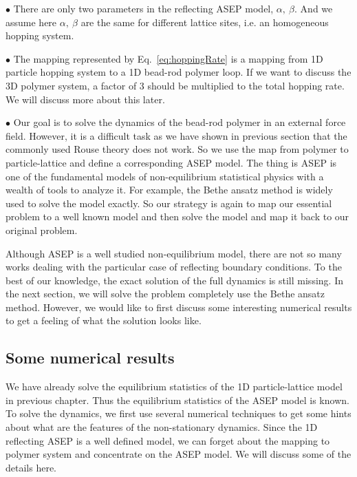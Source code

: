 $\bullet$ There are only two parameters in the reflecting ASEP model, $\alpha,~\beta$. And we assume here $\alpha,~\beta$ are the same for different lattice sites, i.e. an homogeneous hopping system. 

$\bullet$ The mapping represented by Eq.~\eqref{eq:hoppingRate} is a mapping from 1D particle hopping system to a 1D bead-rod polymer loop. If we want to discuss the 3D polymer system, a factor of $3$ should be multiplied to the total hopping rate. We will discuss more about this later. 

$\bullet$ Our goal is to solve the dynamics of the bead-rod polymer in an external force field. However, it is a difficult task as we have shown in previous section that the commonly used Rouse theory does not work. So we use the map from polymer to particle-lattice and define a corresponding ASEP model. The thing is ASEP is one of the fundamental models of non-equilibrium statistical physics with a wealth of tools to analyze it. For example, the Bethe ansatz method is widely used to solve the model exactly. So our strategy is again to map our essential problem to a well known model and then solve the model and map it back to our original problem. 

Although ASEP is a well studied non-equilibrium model, there are not so many works dealing with the particular case of reflecting boundary conditions. To the best of our knowledge, the exact solution of the full dynamics is still missing. In the next section, we will solve the problem completely use the Bethe ansatz method. However, we would like to first discuss some interesting numerical results to get a feeling of what the solution looks like. 

\subsection{Some numerical results}
\label{sub:numerical_results}

We have already solve the equilibrium statistics of the 1D particle-lattice model in previous chapter. Thus the equilibrium statistics of the ASEP model is known. To solve the dynamics, we first use several numerical techniques to get some hints about what are the features of the non-stationary dynamics. Since the 1D reflecting ASEP is a well defined model, we can forget about the mapping to polymer system and concentrate on the ASEP model. We will discuss some of the details here. 

